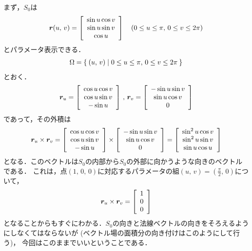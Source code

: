 まず，$S_0$は
\begin{align*}
\bm{r}(u, \, v) = \left[
\renewcommand{\arraystretch}{1}
\begin{array}{c} 
\sin u \cos v \\
\sin u \sin v \\
\cos u
\end{array}
\right]
\quad (0 \leq u \leq \pi , \, 0 \leq v \leq 2 \pi )
\end{align*}
とパラメータ表示できる．
\begin{align*}
\Omega = \Set{ (u, \, v) | 0 \leq u \leq \pi , \, 0 \leq v \leq 2 \pi} 
\end{align*}
とおく．
\begin{align*}
\bm{r}_u = \left[
\renewcommand{\arraystretch}{1}
\begin{array}{c}
\cos u \cos v \\
\cos u \sin v \\
- \sin u
\end{array}
\right] \, , \, \bm{r}_v = \left[
\renewcommand{\arraystretch}{1}
\begin{array}{c}
- \sin u \sin v \\
\sin u \cos v \\
0
\end{array}
\right]
\end{align*}
であって，その外積は
\begin{align*}
\bm{r}_u \times \bm{r}_v = \left[
\renewcommand{\arraystretch}{1}
\begin{array}{c} 
\cos u \cos v \\
\cos u \sin v \\
- \sin u
\end{array}
\right] \times \left[
\renewcommand{\arraystretch}{1}
\begin{array}{c}
- \sin u \sin v \\
\sin u \cos v \\
0
\end{array}
\right] = \left[ 
\renewcommand{\arraystretch}{1}
\begin{array}{c}
\sin^2 u \cos v \\
\sin^2u \sin v \\
\sin u \cos u 
\end{array}
\right]
\end{align*}
となる．このベクトルは$S_0$の内部から$S_0$の外部に向かうような向きのベクトルである．
これは，点$(1, \, 0, \, 0)$に対応するパラメータの組$(u, \, v) = \left( \displaystyle \frac{\pi}{2}, \, 0\right)$について，
\begin{align*}
\bm{r}_u \times \bm{r}_v = \left[
\renewcommand{\arraystretch}{1}
\begin{array}{c}
1 \\
0 \\
0
\end{array}
\right]
\end{align*}
となることからもすぐにわかる．$S_0$の向きと法線ベクトルの向きをそろえるようにしなくてはならないが
(ベクトル場の面積分の向き付けはこのようにして行う)，
今回はこのままでいいということである．

